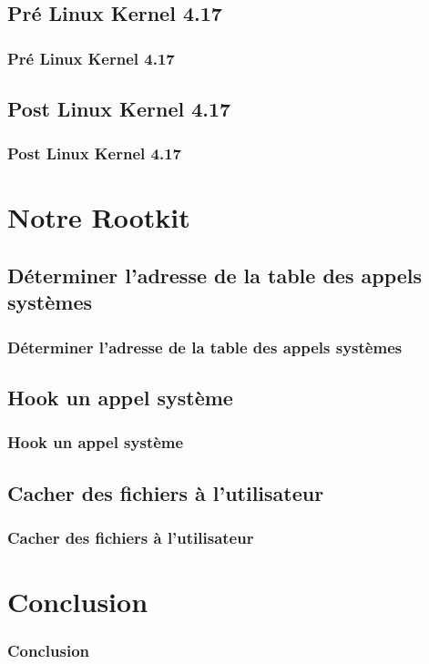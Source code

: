 \documentclass{beamer}
\begin{document}
\subsection{Pré Linux Kernel 4.17}

\begin{frame}
\frametitle{Pré Linux Kernel 4.17}

\end{frame}

\subsection{Post Linux Kernel 4.17}

\begin{frame}
\frametitle{Post Linux Kernel 4.17}
\end{frame}

\section{Notre Rootkit}
\subsection{Déterminer l'adresse de la table des appels systèmes}

\begin{frame}
\frametitle{Déterminer l'adresse de la table des appels systèmes}
\end{frame}

\subsection{Hook un appel système}

\begin{frame}
\frametitle{Hook un appel système}
\end{frame}

\subsection{Cacher des fichiers à l'utilisateur}

\begin{frame}
\frametitle{Cacher des fichiers à l'utilisateur}
\end{frame}

\section{Conclusion}

\begin{frame}
\frametitle{Conclusion}
\end{frame}
\end{document}
